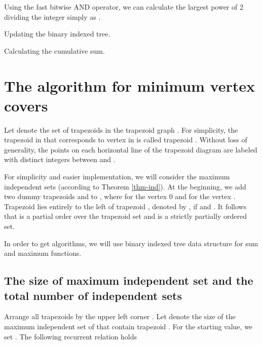 \documentclass[11pt,letter]{article}
\begin{document}
Using the fast bitwise AND operator, we can calculate the largest power of 2 dividing the integer
 simply as .


\begin{algorithm}

    \While {}
    {
        \;
        \;
    }
    \caption{ Updating the binary indexed tree. }
\end{algorithm}


\begin{algorithm}

    \;
    \While{}
    {
        \;
        \;
    }
    \Return \;

    \caption{ Calculating the cumulative sum. }
\end{algorithm}



\section{The algorithm for minimum vertex covers}



Let  denote the set of trapezoids in the trapezoid graph . For
simplicity, the trapezoid in  that corresponds to vertex  in  is called trapezoid .
Without loss of generality, the points on each horizontal line of the trapezoid diagram are labeled
with distinct integers between  and .

For simplicity and easier implementation, we will consider the maximum independent sets (according
to Theorem \ref{thm-ind}). At the beginning, we add two dummy trapezoids  and  to ,
where  for the vertex 0 and 
for the vertex . Trapezoid  lies entirely to the left of trapezoid , denoted by , if  and . It follows that  is a partial order over the
trapezoid set  and  is a strictly partially ordered set.

In order to get  algorithms, we will use binary indexed tree data structure for sum
and maximum functions.


\subsection{The size of maximum independent set and the total number of independent sets}


Arrange all trapezoids by the upper left corner . Let  denote the size of the
maximum independent set of  that contain trapezoid . For
the starting value, we set . The following recurrent relation holds
\end{document}
